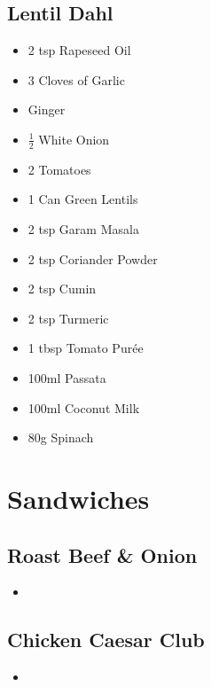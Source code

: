 \documentclass[11pt, english]{article}
\begin{document}
\newpage

	\subsection{Lentil Dahl}

	\begin{itemize}
        \setlength\itemsep{0cm}
                \item 2 tsp Rapeseed Oil
		\item 3 Cloves of Garlic
		\item Ginger
		\item $\frac{1}{2}$ White Onion
		\item 2 Tomatoes
		\item 1 Can Green Lentils
		\item 2 tsp Garam Masala
		\item 2 tsp Coriander Powder
		\item 2 tsp Cumin
		\item 2 tsp Turmeric
		\item 1 tbsp Tomato Pur\'{e}e
		\item 100ml Passata
		\item 100ml Coconut Milk
		\item 80g Spinach
        \end{itemize}

\newpage

\section{Sandwiches}

	\subsection{Roast Beef \& Onion}

	\begin{itemize}
	\setlength\itemsep{0cm}
		\item 
	\end{itemize}

\newpage

	\subsection{Chicken Caesar Club}

	\begin{itemize}
	\setlength\itemsep{0cm}
		\item 
	\end{itemize}
\end{document}
